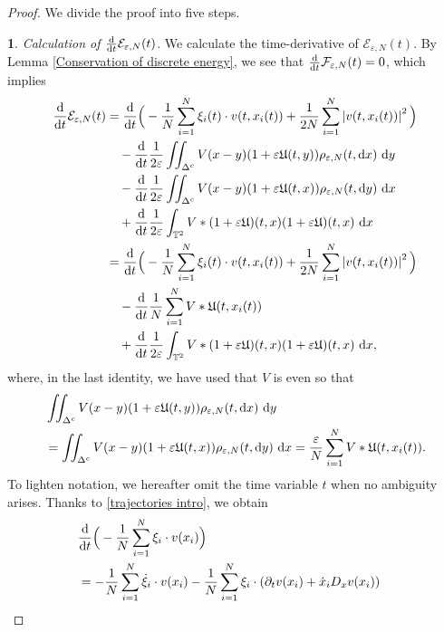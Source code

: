 \documentclass[11pt,reqno]{amsart}
\numberwithin{equation}{section}
\def\dd{{\rm d}}
\begin{document}
\begin{proof}  We divide the proof into five steps.

\smallskip
\textbf{1}. \textit{Calculation of $\frac{\dd}{\dd t}\mathcal{E}_{\varepsilon,N}(t)$}.
We calculate the time-derivative of $\mathcal{E}_{\varepsilon,N}(t)$.
By Lemma \ref{Conservation of discrete energy}, 
we see that $\frac{\dd}{\dd t}\mathcal{F}_{\varepsilon,N}(t)=0$, which implies 
\begin{align*}
\frac{\dd}{\dd t}\mathcal{E}_{\varepsilon,N}(t)
&=\frac{\dd}{\dd t}\Big(-\frac{1}{N}\sum_{i=1}^{N}\xi_{i}(t)\cdot v(t,x_{i}(t))+\frac{1}{2N}\sum_{i=1}^{N}\left\vert v(t,x_{i}(t))\right\vert^{2} \Big)\\
&\quad-\frac{\dd}{\dd t}\frac{1}{2\varepsilon}\iint_{\Delta^{c}}V(x-y)(1+\varepsilon\mathfrak{U}(t,y))\rho_{\varepsilon,N}(t,\dd x)\ \dd y \\
&\quad-\frac{\dd}{\dd t}\frac{1}{2\varepsilon}\iint_{\Delta^{c}}V(x-y)(1+\varepsilon\mathfrak{U}(t,x))\rho_{\varepsilon,N}(t,\dd y)\ \dd x\\
&\quad+\frac{\dd}{\dd t}\frac{1}{2\varepsilon}\int_{\mathbb{T}^{2}} V\ast (1+\varepsilon\mathfrak{U})(t,x)(1+\varepsilon\mathfrak{U})(t,x)\ \dd x\\
&= \frac{\dd}{\dd t}\Big(-\frac{1}{N}\sum_{i=1}^{N}\xi_{i}(t)\cdot v(t,x_{i}(t))+\frac{1}{2N}\sum_{i=1}^{N}\left\vert v(t,x_{i}(t))\right\vert^{2} \Big)\\
&\quad-\frac{\dd}{\dd t}\frac{1}{N}\sum_{i=1}^{N}V\ast \mathfrak{U}(t,x_{i}(t))\\
&\quad+\frac{\dd}{\dd t}\frac{1}{2\varepsilon}\int_{\mathbb{T}^{2}} V\ast (1+\varepsilon\mathfrak{U})(t,x)(1+\varepsilon \mathfrak{U})(t,x)\ \dd x, 
\end{align*}
where, in the last identity, we have used that $V$ is even so that  
\begin{align*}
&\iint_{\Delta^{c}}V(x-y)(1+\varepsilon\mathfrak{U}(t,y))\rho_{\varepsilon,N}(t,\dd x)\ \dd y\\
&=\iint_{\Delta^{c}}V(x-y)(1+\varepsilon\mathfrak{U}(t,x))\rho_{\varepsilon,N}(t,\dd y)\ \dd x
=\frac{\varepsilon}{N}\sum_{i=1}^{N}V\ast \mathfrak{U}(t,x_{i}(t)).  
\end{align*}
To lighten notation, we hereafter omit the time variable $t$ when no ambiguity arises. Thanks to \eqref{trajectories intro}, we obtain
\begin{align}
&\frac{\dd}{\dd t}\Big(-\frac{1}{N}\sum_{i=1}^{N}\xi_{i}\cdot v(x_{i})\Big)& \notag\\
&=-\frac{1}{N}\sum_{i=1}^{N}\dot \xi_{i}\cdot v(x_{i})-\frac{1}{N}\sum_{i=1}^{N}\xi_{i}\cdot (\partial_{t}v(x_{i})+\dot x_{i}D_{x}v(x_{i}))& \notag\\

\end{align}
\end{proof}
\end{document}
